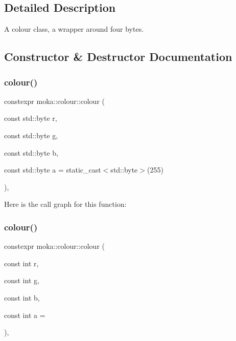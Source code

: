 \subsection{Detailed Description}
A colour class, a wrapper around four bytes. 

\subsection{Constructor \& Destructor Documentation}
\mbox{\label{classmoka_1_1colour_a69c484d6aa34beda220712e751ad99f3}} 
\subsubsection{\texorpdfstring{colour()}{colour()}\hspace{0.1cm}{\footnotesize\ttfamily [1/6]}}
{\footnotesize\ttfamily constexpr moka\+::colour\+::colour (\begin{DoxyParamCaption}\item[{const std\+::byte}]{r,  }\item[{const std\+::byte}]{g,  }\item[{const std\+::byte}]{b,  }\item[{const std\+::byte}]{a = {\ttfamily static\+\_\+cast$<$std\+:\+:byte$>$(255)} }\end{DoxyParamCaption})\hspace{0.3cm}{\ttfamily [inline]}, {\ttfamily [noexcept]}}

Here is the call graph for this function\+:
\mbox{\label{classmoka_1_1colour_a63b2943ce195433250366a55fae7a404}} 
\subsubsection{\texorpdfstring{colour()}{colour()}\hspace{0.1cm}{\footnotesize\ttfamily [2/6]}}
{\footnotesize\ttfamily constexpr moka\+::colour\+::colour (\begin{DoxyParamCaption}\item[{const int}]{r,  }\item[{const int}]{g,  }\item[{const int}]{b,  }\item[{const int}]{a = {} }\end{DoxyParamCaption})\hspace{0.3cm}{\ttfamily [inline]}, {\ttfamily [noexcept]}}

